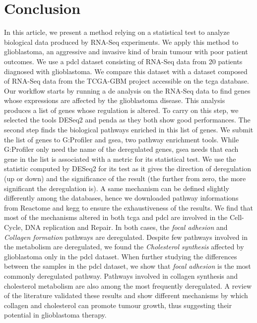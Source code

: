 \section{Conclusion}

In this article, we present a method relying on a statistical test to analyze biological data produced by RNA-Seq experiments.
We apply this method to glioblastoma, an aggressive and invasive kind of brain tumour with poor patient outcomes.
We use a \acrfull{pdcl} dataset consisting of RNA-Seq data from 20 patients diagnosed with glioblastoma.
We compare this dataset with a dataset composed of RNA-Seq data from the TCGA-GBM project accessible on the \acrshort{tcga} database.
Our workflow starts by running a \acrlong{de} analysis on the RNA-Seq data to find genes whose expressions are affected by the glioblastoma disease.
This analysis produces a list of genes whose regulation is altered.
To carry on this step, we selected the tools DESeq2 and \acrshort{penda} as they both show good performances.
The second step finds the biological pathways enriched in this list of genes.
We submit the list of genes to G:Profiler and \acrshort{gsea}, two pathway enrichment tools.
While G:Profiler only need the name of the deregulated genes, \acrshort{gsea} needs that each gene in the list is associated with a metric for its statistical test.
We use the statistic computed by DESeq2 for its test as it gives the direction of deregulation (up or down) and the significance of the result (the further from zero, the more significant the deregulation is).
A same mechanism can be defined slightly differently among the databases, hence we downloaded pathway informations from Reactome and \acrshort{kegg} to ensure the exhaustiveness of the results.
We find that most of the mechanisms altered in both \acrshort{tcga} and \acrshort{pdcl} are involved in the Cell-Cycle, DNA replication and Repair.
In both cases, the \textit{focal adhesion} and \textit{Collagen formation} pathways are deregulated.
Despite few pathways involved in the metabolism are deregulated, we found the \textit{Cholesterol synthesis} affected by glioblastoma only in the \acrshort{pdcl} dataset.
When further studying the differences between the samples in the \acrshort{pdcl} dataset, we show that \textit{focal adhesion} is the most commonly deregulated pathway.
Pathways involved in collagen synthesis and cholesterol metabolism are also among the most frequently deregulated.
A review of the literature validated these results and show different mechanisms by which collagen and cholesterol can promote tumour growth, thus suggesting their potential in glioblastoma therapy.